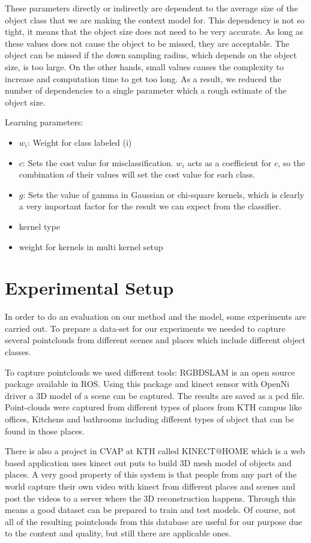 These parameters directly or indirectly are dependent to the average size of the object class that we are making the context model
for. 
This dependency is not so tight, it means that the object size does not need to be very accurate. 
As long as these values does not cause the object to be missed, they are acceptable.
The object can be missed if the down sampling radius, which depends on the object size, is too large. 
On the other hands, small values causes the complexity to increase and computation time to get too long.  
As a result, we reduced the number of dependencies to a single parameter which a rough estimate of the object size.


Learning parameters:
\begin{itemize}
 \item $w_i$: Weight for class labeled (i)
 \item $c$: Sets the cost value for misclassification.
 $w_i$ acts as a coefficient for $c$, so the combination of their values will set the cost value for each class.
 \item $g$: Sets the value of gamma in Gaussian or chi-square kernels, which is clearly a very important factor for the result we can 
expect from the classifier. 
 \item kernel type
 \item weight for kernels in multi kernel setup
\end{itemize}
 

\section{Experimental Setup}
\label{ExperimentalSetup.sec}
In order to do an evaluation on our method and the model, some experiments are carried out.
To prepare a data-set for our experiments we needed to capture several pointclouds from different scenes and places which 
include different object classes.


To capture pointclouds we used different tools:
RGBDSLAM \cite{RGBDSLAM} is an open source  package available in ROS. Using this package and kinect sensor with OpenNi 
driver a 3D model of a scene can be captured. 
The results are saved as a pcd file.
Point-clouds were captured from different types of places from KTH campus like offices, Kitchens and bathrooms including 
different types of object that can be found in those places.

There is also a project in CVAP at KTH called KINECT@HOME \cite{aydemir2012kinect} which is a web based application uses
kinect out puts to build 3D mesh model of objects and places. 
A very good property of this system is that people from any part of the world capture their own video with kinect from different 
places and scenes and post the videos to a server where the 3D reconstruction happens. 
Through this means a good dataset can be prepared to train and test models.
Of course, not all of the resulting pointclouds from this database are useful for our purpose due to the content and
quality, but still there are applicable ones.

